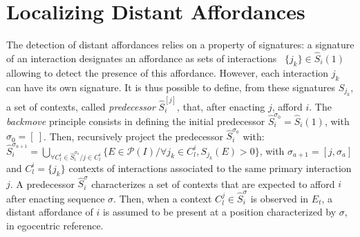 \documentclass[conference]{IEEEtran}
\begin{document}



\section{Localizing Distant Affordances}\label{localize}


The detection of distant affordances relies on a property of signatures: a signature of an interaction designates an affordance as sets of interactions ~$\{j_k\} \in \hat{S}_i(1)$ allowing to detect the presence of this affordance.
However, each interaction $j_k$ can have its own signature. It is thus possible to define, from these signatures $S_{j_k}$, a set of contexts, called \textit{predecessor} $\hat{S}_i^{[j]}$, that, after enacting $j$, afford $i$. The \textit{backmove} principle consists in defining the initial predecessor $\hat{S}_i^{\sigma_0}=\hat{S}_i(1)$, with $\sigma_0=[~]$. Then, recursively project the predecessor $\hat{S}_i^{\sigma_a}$ with:
$\hat{S}_i^{\sigma_{a+1}}\!=\!\bigcup_{\forall C_l^i \in \hat{S}_i^{\sigma_a} / j \in C_l^i} \{E \in \mathcal{P}(I) / \forall j_k \in C_l^i, S_{j_k}(E)\!>\!0\}$,
with $\sigma_{a+1}=[j,\sigma_a]$ and $C_l^i=\{j_k\}$ contexts of interactions associated to the same primary interaction $j$. %
A predecessor $\hat{S}_i^\sigma$ characterizes a set of contexts that are expected to afford $i$ after enacting sequence $\sigma$. %
Then, when a context $C_l^j \in \hat{S}_i^\sigma$ is observed in $E_t$, a distant affordance of $i$ is assumed to be present at a position characterized by $\sigma$, in egocentric reference.
\end{document}
